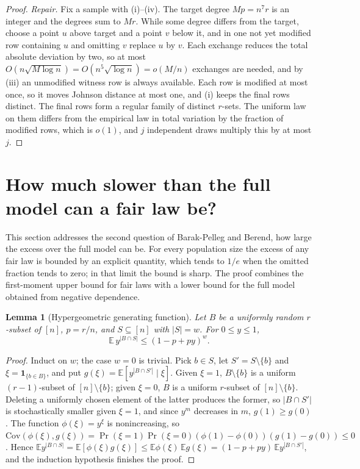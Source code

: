 \documentclass[11pt,a4paper]{article}
\newtheorem{lemma}[theorem]{Lemma}
\theoremstyle{remark}
\newcommand{\E}{\mathbb E}
\newcommand{\ind}{\mathbf 1}
\begin{document}
\begin{proof}
\emph{Repair.} Fix a sample with (i)--(iv). The target degree $Mp=n^7r$ is an integer and the degrees sum to $Mr$. While some degree differs from the target, choose a point $u$ above target and a point $v$ below it, and in one not yet modified row containing $u$ and omitting $v$ replace $u$ by $v$. Each exchange reduces the total absolute deviation by two, so at most $O(n\sqrt{M\log n})=O(n^5\sqrt{\log n})=o(M/n)$ exchanges are needed, and by (iii) an unmodified witness row is always available. Each row is modified at most once, so it moves Johnson distance at most one, and (i) keeps the final rows distinct. The final rows form a regular family of distinct $r$-sets. The uniform law on them differs from the empirical law in total variation by the fraction of modified rows, which is $o(1)$, and $j$ independent draws multiply this by at most $j$.
\end{proof}

\section{How much slower than the full model can a fair law be?}
\label{sec:gap}
This section addresses the second question of Barak-Pelleg and Berend, how large the excess over the full model can be. For every population size the excess of any fair law is bounded by an explicit quantity, which tends to $1/e$ when the omitted fraction tends to zero; in that limit the bound is sharp. The proof combines the first-moment upper bound for fair laws with a lower bound for the full model obtained from negative dependence.

\begin{lemma}[Hypergeometric generating function]\label{lem:pgf}
Let $B$ be a uniformly random $r$-subset of $[n]$, $p=r/n$, and $S\subseteq[n]$ with $|S|=w$. For $0\le y\le1$,
\[
 \E\, y^{|B\cap S|}\le(1-p+py)^w .
\]
\end{lemma}
\begin{proof}
Induct on $w$; the case $w=0$ is trivial. Pick $b\in S$, let $S'=S\setminus\{b\}$ and $\xi=\ind_{\{b\in B\}}$, and put $g(\xi)=\E[y^{|B\cap S'|}\mid\xi]$. Given $\xi=1$, $B\setminus\{b\}$ is a uniform $(r-1)$-subset of $[n]\setminus\{b\}$; given $\xi=0$, $B$ is a uniform $r$-subset of $[n]\setminus\{b\}$. Deleting a uniformly chosen element of the latter produces the former, so $|B\cap S'|$ is stochastically smaller given $\xi=1$, and since $y^m$ decreases in $m$, $g(1)\ge g(0)$. The function $\phi(\xi)=y^\xi$ is nonincreasing, so $\mathrm{Cov}(\phi(\xi),g(\xi))=\Pr(\xi=1)\Pr(\xi=0)(\phi(1)-\phi(0))(g(1)-g(0))\le0$. Hence $\E y^{|B\cap S|}=\E[\phi(\xi)g(\xi)]\le\E\phi(\xi)\,\E g(\xi)=(1-p+py)\,\E y^{|B\cap S'|}$, and the induction hypothesis finishes the proof.
\end{proof}
\end{document}
